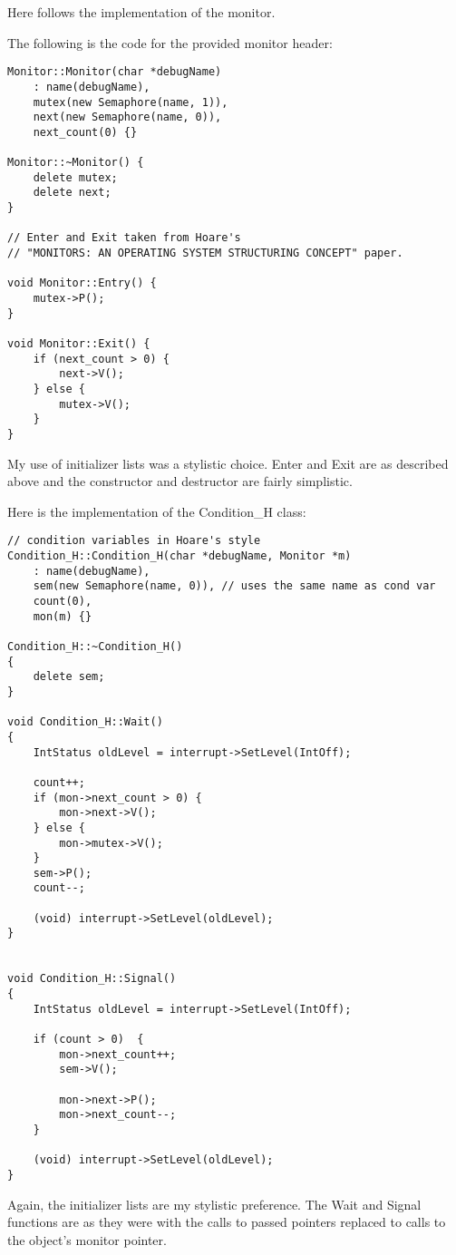\documentclass[11pt]{article}
\begin{document}
\begin{question}
    Here follows the implementation of the monitor.

    The following is the code for the provided monitor header:
    \begin{verbatim}
Monitor::Monitor(char *debugName)
    : name(debugName),
    mutex(new Semaphore(name, 1)),
    next(new Semaphore(name, 0)),
    next_count(0) {}

Monitor::~Monitor() {
    delete mutex;
    delete next;
}

// Enter and Exit taken from Hoare's
// "MONITORS: AN OPERATING SYSTEM STRUCTURING CONCEPT" paper.

void Monitor::Entry() {
    mutex->P();
}

void Monitor::Exit() {
    if (next_count > 0) {
        next->V();
    } else {
        mutex->V();
    }
}
    \end{verbatim}

    My use of initializer lists was a stylistic choice. Enter and Exit are as described above and the constructor and destructor are fairly simplistic.

    Here is the implementation of the Condition\_H class:
    \begin{verbatim}
// condition variables in Hoare's style
Condition_H::Condition_H(char *debugName, Monitor *m)
    : name(debugName),
    sem(new Semaphore(name, 0)), // uses the same name as cond var
    count(0),
    mon(m) {}

Condition_H::~Condition_H()
{
    delete sem;
}

void Condition_H::Wait()
{
    IntStatus oldLevel = interrupt->SetLevel(IntOff);

    count++;
    if (mon->next_count > 0) {
        mon->next->V();
    } else {
        mon->mutex->V();
    }
    sem->P();
    count--;

    (void) interrupt->SetLevel(oldLevel);
}


void Condition_H::Signal()
{
    IntStatus oldLevel = interrupt->SetLevel(IntOff);

    if (count > 0)  {
        mon->next_count++;
        sem->V();

        mon->next->P();
        mon->next_count--;
    }

    (void) interrupt->SetLevel(oldLevel);
}
    \end{verbatim}

    Again, the initializer lists are my stylistic preference. The Wait and Signal functions are as they were with the calls to passed pointers replaced to calls to the object's monitor pointer.


\end{question}
\end{document}
